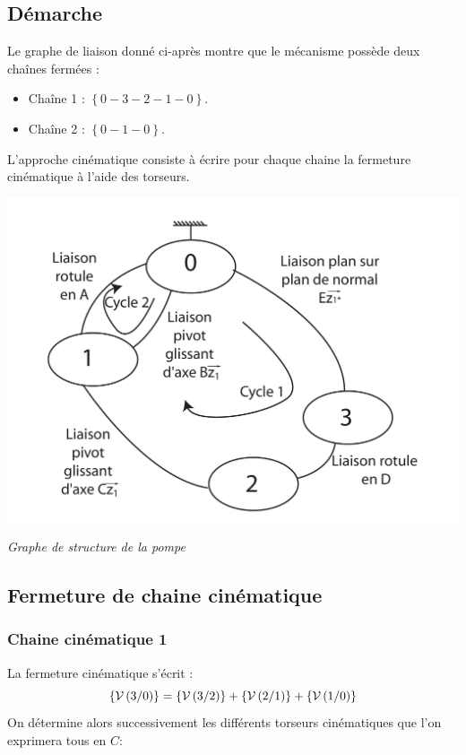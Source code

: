 \documentclass[10pt,fleqn]{article} %
\begin{document}
\subsection{Démarche}
Le graphe de liaison donné ci-après montre que le mécanisme possède deux chaînes fermées :
\begin{itemize}
\item Chaîne 1 : $\left\{0-3-2-1-0\right\}$.
\item Chaîne 2 : $\left\{0-1-0\right\}$.
\end{itemize}
L'approche cinématique consiste à écrire pour chaque chaine la fermeture cinématique à l'aide des torseurs.




\begin{center}
\includegraphics[width=\linewidth]{images/graph_structure_pompe2.pdf}

\textit{Graphe de structure de la pompe \label{fig:graphe_structure_pompe2}}
\end{center}


\subsection{Fermeture de chaine cinématique}
\subsubsection{Chaine cinématique 1}

La fermeture cinématique s'écrit :
$$
\left\{\mathcal{V} \left(3/0 \right) \right\} = \left\{\mathcal{V} \left(3/2 \right) \right\}
+\left\{\mathcal{V} \left(2/1 \right) \right\}
+\left\{\mathcal{V} \left(1/0 \right) \right\}
$$
		On détermine alors successivement les différents torseurs cinématiques que l'on exprimera tous en $C$:
\end{document}
